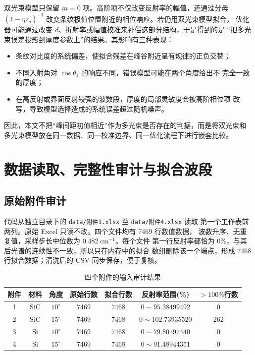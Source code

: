 \documentclass[UTF8,12pt,a4paper]{ctexart}
\begin{document}
双光束模型只保留 $m=0$ 项。高阶项不仅改变反射率的幅值，还通过分母
$(1-\eta z_q)^{-1}$ 改变条纹极值位置附近的相位响应。若仍用双光束模型拟合，
优化器可能通过改变 $d$、折射率或幅值校准来补偿这部分结构，于是得到的是
“把多光束误差投影到厚度参数上”的结果。其影响有三种表现：

\begin{itemize}
  \item 条纹对比度的系统偏差，使拟合残差在峰谷附近呈有规律的正负交替；
  \item 不同入射角对 $\cos\theta_1$ 的响应不同，错误模型可能在两个角度给出不
  完全一致的厚度；
  \item 在高反射或界面反射较强的波数段，厚度的局部灵敏度会被高阶相位项
  改写，导致模型选择造成的系统误差超过随机噪声。
\end{itemize}

因此，本文不把“峰间距初值相近”作为多光束是否存在的判据，而是将双光束和
多光束模型放在同一数据、同一校准边界、同一优化流程下进行嵌套比较。

\section{数据读取、完整性审计与拟合波段}

\subsection{原始附件审计}

代码从独立目录下的 \verb|data/附件1.xlsx| 至 \verb|data/附件4.xlsx| 读取
第一个工作表前两列。原始 Excel 只读不改。四个文件均有 7469 行数值数据，
波数升序、无重复值，采样步长中位数为 $0.482\ \mathrm{cm}^{-1}$。每个文件
第一行反射率都恰为 $0\%$，与其后光谱的连续性不一致，所以只在内存中的拟合
数组删除该一个端点，形成 7468 行拟合数据；清洗后的 CSV 同步保存，便于复核。

\begin{table}[H]
  \centering
  \caption{四个附件的输入审计结果}
  \label{tab:audit}
  \small
  \setlength{\tabcolsep}{3pt}
  \begin{tabular}{ccccccc}
    \toprule
    附件 & 材料 & 角度 & 原始行数 & 拟合行数 & 反射率范围(\%) & $>100\%$行数\\
    \midrule
    1 & SiC & $10^\circ$ & 7469 & 7468 & $0\sim95.38499492$ & 0\\
    2 & SiC & $15^\circ$ & 7469 & 7468 & $0\sim102.73935520$ & 262\\
    3 & Si  & $10^\circ$ & 7469 & 7468 & $0\sim79.80197440$ & 0\\
    4 & Si  & $15^\circ$ & 7469 & 7468 & $0\sim91.48944351$ & 0\\
    \bottomrule
  \end{tabular}
\end{table}
\end{document}
